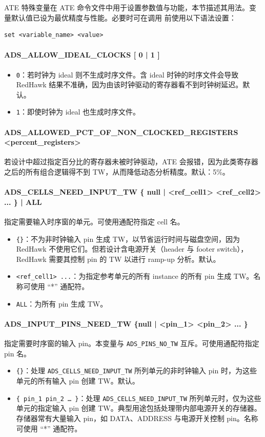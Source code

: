 ATE 特殊变量在 ATE 命令文件中用于设置参数值与功能，本节描述其用法。变量默认值已设为最优精度与性能。必要时可在调用  前使用以下语法设置：
\begin{lstlisting}
set <variable_name> <value>
\end{lstlisting}

\paragraph{ADS\_ALLOW\_IDEAL\_CLOCKS [ 0 | 1 ]}
\begin{itemize}
  \item \texttt{0}：若时钟为 ideal 则不生成时序文件。含 ideal 时钟的时序文件会导致 RedHawk 结果不准确，因为由该时钟驱动的寄存器看不到时钟树延迟。默认。
  \item \texttt{1}：即使时钟为 ideal 也生成时序文件。
\end{itemize}

\paragraph{ADS\_ALLOWED\_PCT\_OF\_NON\_CLOCKED\_REGISTERS <percent\_registers>}
若设计中超过指定百分比的寄存器未被时钟驱动，ATE 会报错，因为此类寄存器之后的所有组合逻辑得不到 TW，从而降低动态分析精度。默认：5\%。

\paragraph{ADS\_CELLS\_NEED\_INPUT\_TW \{ null | <ref\_cell1> <ref\_cell2> ... \} | ALL}
指定需要输入时序窗的单元。可使用通配符指定 cell 名。
\begin{itemize}
  \item \texttt{\{\}}：不为非时钟输入 pin 生成 TW，以节省运行时间与磁盘空间，因为 RedHawk 不使用它们。但若设计含电源开关（header 与 footer switch），RedHawk 需要其控制 pin 的 TW 以进行 ramp-up 分析。默认。
  \item \texttt{<ref\_cell1> ...}：为指定参考单元的所有 instance 的所有 pin 生成 TW。名称可使用 ``*'' 通配符。
  \item \texttt{ALL}：为所有 pin 生成 TW。
\end{itemize}

\paragraph{ADS\_INPUT\_PINS\_NEED\_TW \{null | <pin\_1> <pin\_2> ... \}}
指定需要时序窗的输入 pin。本变量与 \texttt{ADS\_PINS\_NO\_TW} 互斥。可使用通配符指定 pin 名。
\begin{itemize}
  \item \texttt{\{\}}：处理 \texttt{ADS\_CELLS\_NEED\_INPUT\_TW} 所列单元的非时钟输入 pin 时，为这些单元的所有输入 pin 创建 TW。默认。
  \item \texttt{\{ pin\_1 pin\_2 … \}}：处理 \texttt{ADS\_CELLS\_NEED\_INPUT\_TW} 所列单元时，仅为这些单元的指定输入 pin 创建 TW。典型用途包括处理带内部电源开关的存储器。存储器常有大量输入 pin，如 DATA、ADDRESS 与电源开关控制 pin。名称可使用 ``*'' 通配符。
\end{itemize}

